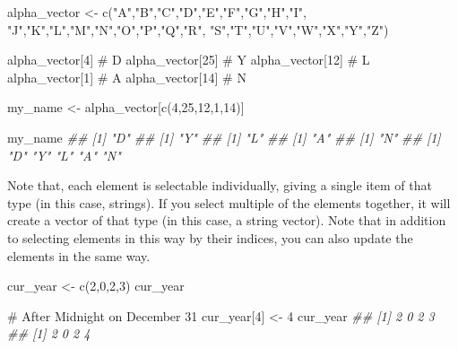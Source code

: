 \documentclass[
  letterpaper,
  DIV=11,
  numbers=noendperiod]{scrreprt}
\newenvironment{Shaded}{\begin{snugshade}}{\end{snugshade}}
\newcommand{\CommentTok}[1]{\textcolor[rgb]{0.37,0.37,0.37}{#1}}
\newcommand{\DecValTok}[1]{\textcolor[rgb]{0.68,0.00,0.00}{#1}}
\newcommand{\DocumentationTok}[1]{\textcolor[rgb]{0.37,0.37,0.37}{\textit{#1}}}
\newcommand{\FunctionTok}[1]{\textcolor[rgb]{0.28,0.35,0.67}{#1}}
\newcommand{\NormalTok}[1]{\textcolor[rgb]{0.00,0.23,0.31}{#1}}
\newcommand{\OtherTok}[1]{\textcolor[rgb]{0.00,0.23,0.31}{#1}}
\newcommand{\StringTok}[1]{\textcolor[rgb]{0.13,0.47,0.30}{#1}}
\theoremstyle{definition}
\theoremstyle{definition}
\theoremstyle{definition}
\theoremstyle{remark}
\begin{document}
\begin{Shaded}
\begin{Highlighting}[]
\NormalTok{alpha\_vector }\OtherTok{\textless{}{-}} \FunctionTok{c}\NormalTok{(}\StringTok{"A"}\NormalTok{,}\StringTok{"B"}\NormalTok{,}\StringTok{"C"}\NormalTok{,}\StringTok{"D"}\NormalTok{,}\StringTok{"E"}\NormalTok{,}\StringTok{"F"}\NormalTok{,}\StringTok{"G"}\NormalTok{,}\StringTok{"H"}\NormalTok{,}\StringTok{"I"}\NormalTok{,}
                  \StringTok{"J"}\NormalTok{,}\StringTok{"K"}\NormalTok{,}\StringTok{"L"}\NormalTok{,}\StringTok{"M"}\NormalTok{,}\StringTok{"N"}\NormalTok{,}\StringTok{"O"}\NormalTok{,}\StringTok{"P"}\NormalTok{,}\StringTok{"Q"}\NormalTok{,}\StringTok{"R"}\NormalTok{,}
                  \StringTok{"S"}\NormalTok{,}\StringTok{"T"}\NormalTok{,}\StringTok{"U"}\NormalTok{,}\StringTok{"V"}\NormalTok{,}\StringTok{"W"}\NormalTok{,}\StringTok{"X"}\NormalTok{,}\StringTok{"Y"}\NormalTok{,}\StringTok{"Z"}\NormalTok{)}

\NormalTok{alpha\_vector[}\DecValTok{4}\NormalTok{]    }\CommentTok{\# D}
\NormalTok{alpha\_vector[}\DecValTok{25}\NormalTok{]   }\CommentTok{\# Y }
\NormalTok{alpha\_vector[}\DecValTok{12}\NormalTok{]   }\CommentTok{\# L}
\NormalTok{alpha\_vector[}\DecValTok{1}\NormalTok{]    }\CommentTok{\# A}
\NormalTok{alpha\_vector[}\DecValTok{14}\NormalTok{]   }\CommentTok{\# N}

\NormalTok{my\_name }\OtherTok{\textless{}{-}}\NormalTok{ alpha\_vector[}\FunctionTok{c}\NormalTok{(}\DecValTok{4}\NormalTok{,}\DecValTok{25}\NormalTok{,}\DecValTok{12}\NormalTok{,}\DecValTok{1}\NormalTok{,}\DecValTok{14}\NormalTok{)]}

\NormalTok{my\_name }
\DocumentationTok{\#\# [1] "D"}
\DocumentationTok{\#\# [1] "Y"}
\DocumentationTok{\#\# [1] "L"}
\DocumentationTok{\#\# [1] "A"}
\DocumentationTok{\#\# [1] "N"}
\DocumentationTok{\#\# [1] "D" "Y" "L" "A" "N"}
\end{Highlighting}
\end{Shaded}

Note that, each element is selectable individually, giving a single item
of that type (in this case, strings). If you select multiple of the
elements together, it will create a vector of that type (in this case, a
string vector). Note that in addition to selecting elements in this way
by their indices, you can also update the elements in the same way.

\begin{Shaded}
\begin{Highlighting}[]
\NormalTok{cur\_year }\OtherTok{\textless{}{-}} \FunctionTok{c}\NormalTok{(}\DecValTok{2}\NormalTok{,}\DecValTok{0}\NormalTok{,}\DecValTok{2}\NormalTok{,}\DecValTok{3}\NormalTok{)}
\NormalTok{cur\_year }

\CommentTok{\# After Midnight on December 31}
\NormalTok{cur\_year[}\DecValTok{4}\NormalTok{] }\OtherTok{\textless{}{-}} \DecValTok{4}
\NormalTok{cur\_year }
\DocumentationTok{\#\# [1] 2 0 2 3}
\DocumentationTok{\#\# [1] 2 0 2 4}
\end{Highlighting}
\end{Shaded}
\end{document}
